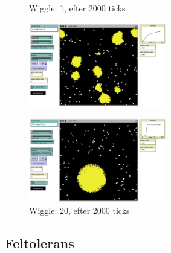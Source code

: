 \documentclass[titlepage, a4paper, 12pt]{article}
\begin{document}
\begin{figure}[H]
  \begin{minipage}[b]{0.5\linewidth}
    \centering
    \caption{Wiggle: 1, efter 2000 ticks}\label{fig:wiggle1}
    \includegraphics[width=6cm]{images/1-wiggleTest-2-2000.png}
  \end{minipage}
  \begin{minipage}[b]{0.5\linewidth}
    \centering
    \caption{Wiggle: 20, efter 2000 ticks}\label{fig:wiggle20}
    \includegraphics[width=6cm]{images/20-wiggleTest-4-2000.png}
  \end{minipage}
\end{figure}


\subsection{Feltolerans}

\end{document}
